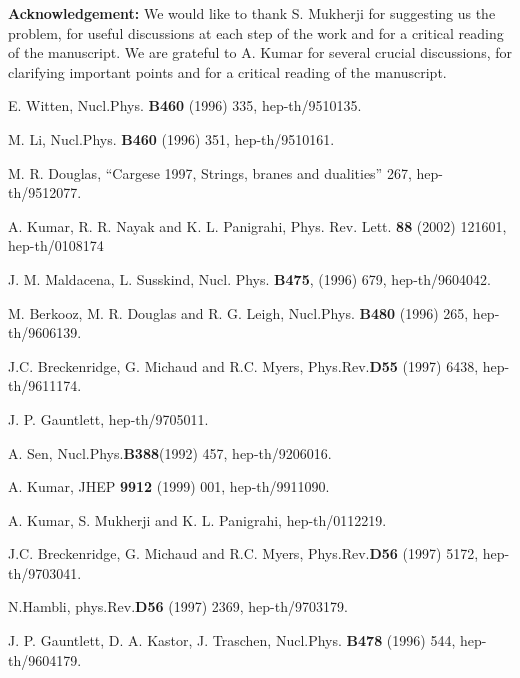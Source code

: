 \documentclass[a4paper,12pt,fleqn,cite,epsfig]{article}
\begin{document}
{\bf Acknowledgement:} We would like to thank S. Mukherji for
suggesting us the problem, for useful discussions at each step of
the work and for a critical reading of the manuscript. We are grateful
to A. Kumar for several crucial discussions, for clarifying important
points and for a critical reading of the manuscript.
\begin{thebibliography}{99}
 E. Witten,  Nucl.Phys. {\bf B460} (1996) 335,   
 hep-th/9510135. 

 M. Li, Nucl.Phys. {\bf B460} (1996) 351, hep-th/9510161.

 M. R. Douglas, ``Cargese 1997, Strings, 
branes and dualities'' 267, hep-th/9512077.

 A. Kumar, R. R. Nayak and K. L. Panigrahi,
Phys. Rev. Lett. {\bf 88} (2002) 121601, hep-th/0108174

 J. M. Maldacena, L. Susskind, Nucl. Phys. {\bf
 B475}, (1996) 679, hep-th/9604042.
      
 M. Berkooz, M. R. Douglas and R. G. Leigh,
Nucl.Phys. {\bf B480} (1996) 265, hep-th/9606139.
 
 J.C. Breckenridge, G. Michaud and R.C. Myers,
 Phys.Rev.{\bf D55} (1997) 6438, hep-th/9611174.

 J. P. Gauntlett, hep-th/9705011.

 A. Sen, Nucl.Phys.{\bf B388}(1992) 457, hep-th/9206016.

 A. Kumar, JHEP {\bf 9912} (1999) 001,
  hep-th/9911090. 

 A. Kumar, S. Mukherji and K. L. Panigrahi,  
hep-th/0112219.

 J.C. Breckenridge, G. Michaud and
 R.C. Myers, Phys.Rev.{\bf D56} (1997) 5172, hep-th/9703041. 

 N.Hambli,  phys.Rev.{\bf D56} (1997) 2369,
 hep-th/9703179.

J. P. Gauntlett, D. A. Kastor, J. Traschen,
Nucl.Phys. {\bf B478} (1996) 544, hep-th/9604179.


\end{thebibliography}
\end{document}
